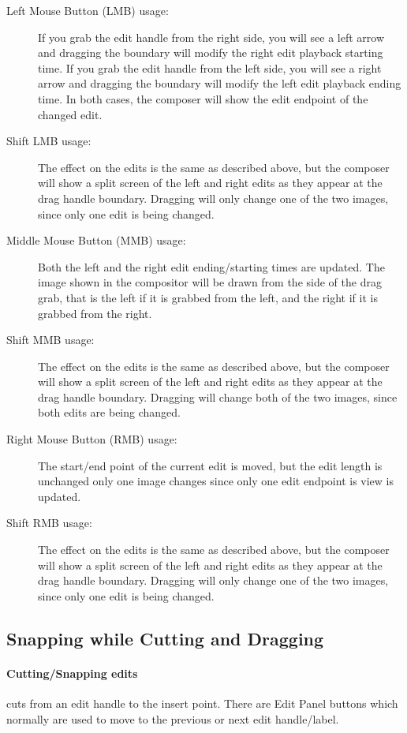 \begin{description}
\item[Left Mouse Button (LMB) usage:] If you grab the edit
  handle from the right side, you will see a left arrow and dragging
  the boundary will modify the right edit playback starting time. If
  you grab the edit handle from the left side, you will see a right
  arrow and dragging the boundary will modify the left edit playback
  ending time. In both cases, the composer will show the edit endpoint
  of the changed edit.
\item[Shift LMB usage:] The effect on the edits is the same as
  described above, but the composer will show a split screen of the
  left and right edits as they appear at the drag handle
  boundary. Dragging will only change one of the two images, since
  only one edit is being changed.
\item[Middle Mouse Button (MMB) usage:] Both the left and the
  right edit ending/starting times are updated.  The image shown in
  the compositor will be drawn from the side of the drag grab, that is
  the left if it is grabbed from the left, and the right if it is
  grabbed from the right.
\item[Shift MMB usage:] The effect on the edits is the same as
  described above, but the composer will show a split screen of the
  left and right edits as they appear at the drag handle boundary.
  Dragging will change both of the two images, since both edits are
  being changed.
\item[Right Mouse Button (RMB) usage:] The start/end point of
  the current edit is moved, but the edit length is unchanged only one
  image changes since only one edit endpoint is view is updated.
\item[Shift RMB usage:] The effect on the edits is the same as
  described above, but the composer will show a split screen of the
  left and right edits as they appear at the drag handle boundary.
  Dragging will only change one of the two images, since only one edit
  is being changed.
\end{description}


\subsection{Snapping while Cutting and Dragging}%
\label{sub:snapping_cutting_dragging}

\paragraph{Cutting/Snapping edits} cuts from an edit handle to the
insert point.  There are Edit Panel buttons which normally are used
to move to the previous or next edit handle/label.

